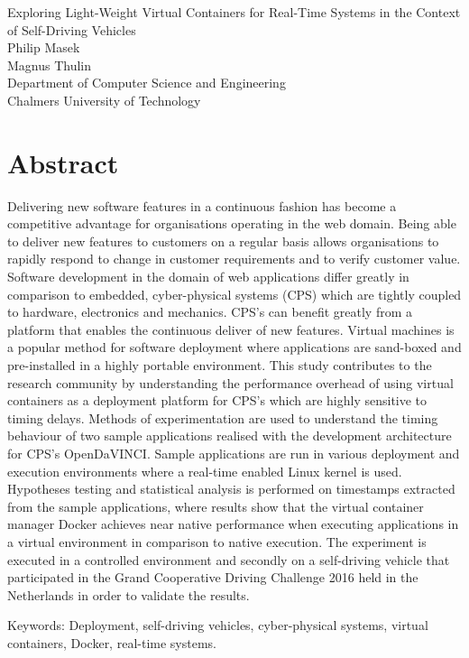Exploring Light-Weight Virtual Containers for Real-Time Systems in the Context of Self-Driving Vehicles\\
Philip Masek\\
Magnus Thulin\\
Department of Computer Science and Engineering\\
Chalmers University of Technology \setlength{\parskip}{0.5cm}

\thispagestyle{plain}			%
\setlength{\parskip}{0pt plus 1.0pt}
\section*{Abstract}
Delivering new software features in a continuous fashion has become a competitive advantage for organisations operating in the web domain. Being able to deliver new features to customers on a regular basis allows organisations to rapidly respond to change in customer requirements and to verify customer value. Software development in the domain of web applications differ greatly in comparison to embedded, cyber-physical systems (CPS) which are tightly coupled to hardware, electronics and mechanics. CPS's can benefit greatly from a platform that enables the continuous deliver of new features. Virtual machines is a popular method for software deployment where applications are sand-boxed and pre-installed in a highly portable environment. This study contributes to the research community by understanding the performance overhead of using virtual containers as a deployment platform for CPS's which are highly sensitive to timing delays. Methods of experimentation are used to understand the timing behaviour of two sample applications realised with the development architecture for CPS's OpenDaVINCI. Sample applications are run in various deployment and execution environments where a real-time enabled Linux kernel is used. Hypotheses testing and statistical analysis is performed on timestamps extracted from the sample applications, where results show that the virtual container manager Docker achieves near native performance when executing applications in a virtual environment in comparison to native execution.  The experiment is executed in a controlled environment and secondly on a self-driving vehicle that participated in the Grand Cooperative Driving Challenge 2016 held in the Netherlands in order to validate the results. 





\vfill
Keywords: Deployment, self-driving vehicles, cyber-physical systems, virtual containers, Docker, real-time systems.

\newpage				%
\thispagestyle{empty}
\mbox{}